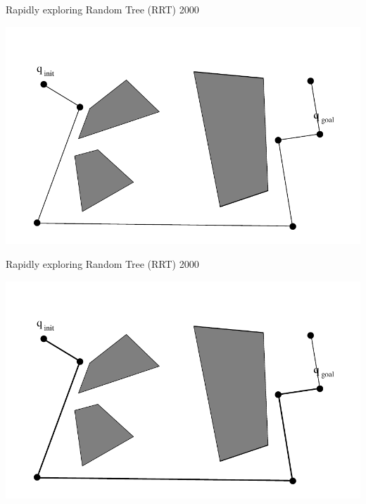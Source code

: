 \begin{frame} {Rapidly exploring Random Tree (RRT) 2000}
\centerline {
  \includegraphics[width=.8\linewidth]{figures/RRT15.pdf}
}
\end{frame}

\begin{frame} {Rapidly exploring Random Tree (RRT) 2000}
\centerline {
  \includegraphics[width=.8\linewidth]{figures/RRT16.pdf}
}
\end{frame}

%
%

